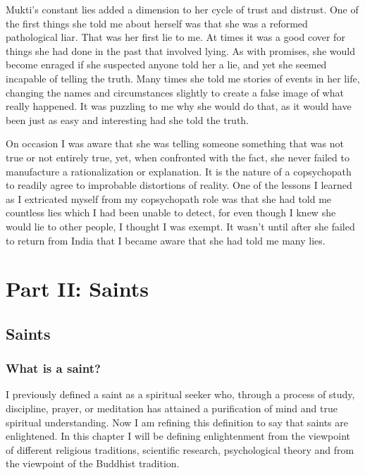 \documentclass[a5paper,10pt,english]{book}
\begin{document}
\sphinxAtStartPar
Mukti’s constant lies added a dimension to her cycle of trust and
distrust. One of the first things she told me about herself was that she
was a reformed pathological liar. That was her first lie to me. At times
it was a good cover for things she had done in the past that involved
lying. As with promises, she would become enraged if she suspected
anyone told her a lie, and yet she seemed incapable of telling the
truth. Many times she told me stories of events in her life, changing
the names and circumstances slightly to create a false image of what
really happened. It was puzzling to me why she would do that, as it
would have been just as easy and interesting had she told the truth.

\sphinxAtStartPar
On occasion I was aware that she was telling someone something that was
not true or not entirely true, yet, when confronted with the fact, she
never failed to manufacture a rationalization or explanation. It is the
nature of a co\sphinxhyphen{}psychopath to readily agree to improbable distortions of
reality. One of the lessons I learned as I extricated myself from my
co\sphinxhyphen{}psychopath role was that she had told me countless lies which I had
been unable to detect, for even though I knew she would lie to other
people, I thought I was exempt. It wasn’t until after she failed to
return from India that I became aware that she had told me many lies.

\sphinxstepscope


\chapter{Part II: Saints}
\label{\detokenize{saints:part-ii-saints}}\label{\detokenize{saints::doc}}

\section{Saints}
\label{\detokenize{saints:saints}}

\subsection{What is a saint?}
\label{\detokenize{saints:what-is-a-saint}}
\sphinxAtStartPar
I previously defined a saint as a spiritual seeker who, through a
process of study, discipline, prayer, or meditation has attained a
purification of mind and true spiritual understanding. Now I am refining
this definition to say that saints are enlightened. In this chapter I
will be defining enlightenment from the viewpoint of different religious
traditions, scientific research, psychological theory and from the
viewpoint of the Buddhist tradition.
\end{document}
